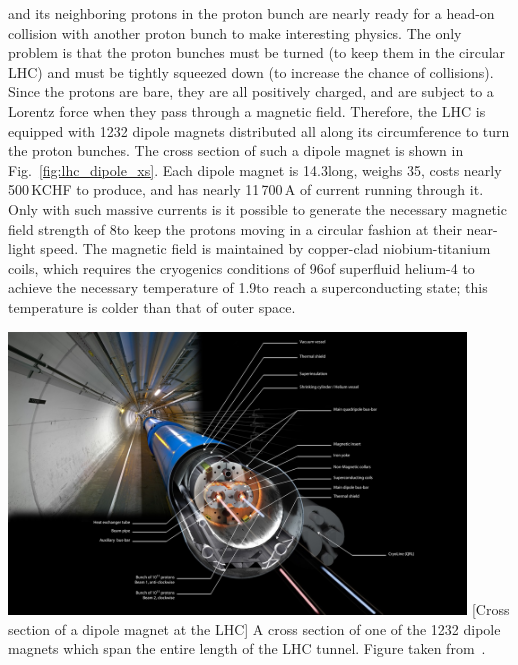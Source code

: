\pname and its neighboring protons in the proton bunch are nearly ready for a head-on collision with another proton bunch to make interesting physics.
The only problem is that the proton bunches must be turned (to keep them in the circular LHC) and must be tightly squeezed down (to increase the chance of \pp collisions).
Since the protons are bare, they are all positively charged, and are subject to a Lorentz force when they pass through a magnetic field.
Therefore, the LHC is equipped with 1232 dipole magnets distributed all along its circumference to turn the proton bunches.
The cross section of such a dipole magnet is shown in Fig.~\ref{fig:lhc_dipole_xs}.
Each dipole magnet is 14.3\meter long, weighs 35\tonne, costs nearly 500\,KCHF to produce, and has nearly 11\,700\,A of current running through it.
Only with such massive currents is it possible to generate the necessary magnetic field strength of 8\tesla to keep the protons moving in a circular fashion at their near-light speed. 
The magnetic field is maintained by copper-clad niobium-titanium coils, which requires the cryogenics conditions of 96\tonne of superfluid helium-4 to achieve the necessary temperature of 1.9\kelvin to reach a superconducting state; 
this temperature is colder than that of outer space.
\begin{multiFigure}
    \centering
        \includegraphics[height=7.5cm,keepaspectratio]{figures/lhc/lhc_dipole_xs.jpg}
        [Cross section of a dipole magnet at the LHC]
        {A cross section of one of the 1232 dipole magnets which span the entire length of the LHC tunnel.
        Figure taken from~\cite{dipole_xs}.} 
    \label{fig:lhc_dipole_xs}
\end{multiFigure}

